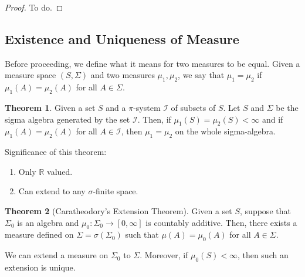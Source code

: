 \documentclass[11pt]{article}
\theoremstyle{definition}
\theoremstyle{theorem}
\newtheorem{thm}{Theorem}[section]
\newcommand{\R}[0]{\mathbb{R}}
\newcommand{\pisys}[0]{\mathcal{I}}
\begin{document}
\begin{proof}
	To do.
\end{proof}

\subsection{Existence and Uniqueness of Measure}
Before proceeding, we define what it means for two measures to be equal. Given a measure space \( (S, \Sigma) \) and two measures \( \mu_1, \mu_2 \), we say that \( \mu_1 = \mu_2 \) if \( \mu_1(A) = \mu_2 (A) \) for all \(A \in \Sigma \).

\begin{thm}
Given a set \( S \) and a \( \pi \)-system \( \pisys \) 	of subsets of \( S \). Let \(S \) and \( \Sigma \) be the sigma algebra  generated by the set \( \pisys \). Then, if \( \mu_1(S) = \mu_2(S) < \infty \) and if \( \mu_1(A)= \mu_2(A) \) for all \( A \in \pisys \), then \( \mu_1 = \mu_2 \) on the whole sigma-algebra. 
\end{thm}
Significance of this theorem:
\begin{enumerate}[noitemsep]
	\item Only \( \R \) valued.
	\item Can extend to any \( \sigma\)-finite space.
\end{enumerate}

\begin{thm}[Caratheodory's Extension Theorem]
Given a set \( S \), suppose that \( \Sigma_0 \) is an algebra and \( \mu_0: \Sigma_0 \rightarrow [0, \infty ] \) is countably additive. Then, there exists a measure defined on \( \Sigma = \sigma ( \Sigma_0 ) \) such that \( \mu(A) = \mu_0(A) \) for all \( A \in \Sigma \). 	
\end{thm}
We can extend a measure on \( \Sigma_0 \) to \( \Sigma \). Moreover, if \( \mu_0(S) <\infty \), then such an extension is unique. 
\end{document}
